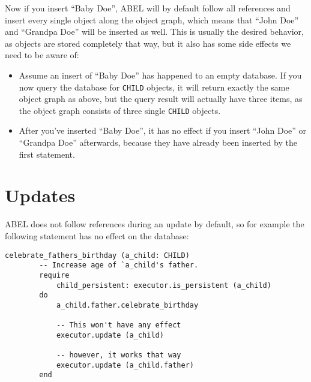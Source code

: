 \documentclass[a4paper,12pt]{report}
\begin{document}
	\begin{center}
	\end{center}

Now if you insert ``Baby Doe'', ABEL will by default follow all references and insert every single object along the object graph, which means that ``John Doe'' and ``Grandpa Doe'' will be inserted as well.
This is usually the desired behavior, as objects are stored completely that way, but it also has some side effects we need to be aware of:

\begin{itemize}
\item Assume an insert of ``Baby Doe'' has happened to an empty database. 
If you now query the database for \lstinline!CHILD! objects, it will return exactly the same object graph as above, but the query result will actually have three items, as the object graph consists of three single \lstinline!CHILD! objects.
	
\item After you've inserted ``Baby Doe'', it has no effect if you insert ``John Doe'' or ``Grandpa Doe'' afterwards, because they have already been inserted by the first statement.
\end{itemize}

\section{Updates}

ABEL does not follow references during an update by default, so for example the following statement has no effect on the database:

\begin{lstlisting}[language=OOSC2Eiffel, captionpos=b, caption={References are not followed by default during updates.}, label={lst:reference_update}]
	celebrate_fathers_birthday (a_child: CHILD)
		-- Increase age of `a_child's father.
		require
			child_persistent: executor.is_persistent (a_child)
		do
			a_child.father.celebrate_birthday

			-- This won't have any effect
			executor.update (a_child)

			-- however, it works that way
			executor.update (a_child.father)
		end
\end{lstlisting}
\end{document}
